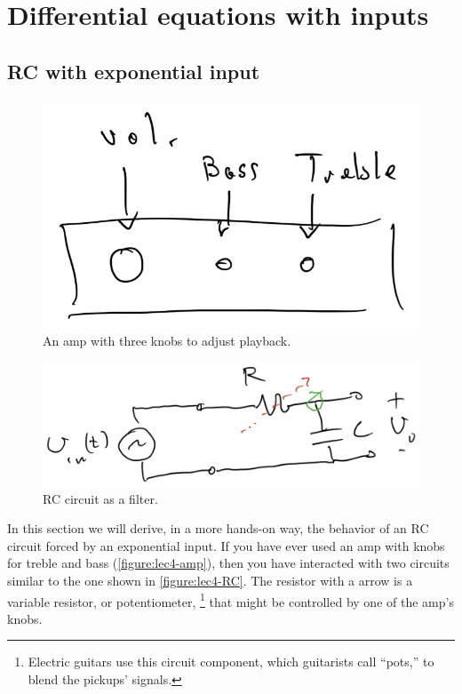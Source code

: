 \chapter{Differential equations with inputs}
\section{RC with exponential input}
\begin{figure}
  \centering
  \includegraphics[width=0.5\linewidth]{figures/4/amp}
  \caption{An amp with three knobs to adjust playback.}
  \label{figure:lec4-amp}
\end{figure}
\begin{figure}
  \centering
  \includegraphics[width=1\linewidth]{figures/4/RC}
  \caption{RC circuit as a filter.}
  \label{figure:lec4-RC}
\end{figure}

In this section we will derive, in a more hands-on way, the behavior of an RC circuit forced by an exponential input.
If you have ever used an amp%
with knobs for treble and bass (\autoref{figure:lec4-amp}), then you have interacted with two circuits
similar to the one shown in \autoref{figure:lec4-RC}.
The resistor with a arrow is a variable resistor, or potentiometer,%
\footnote{Electric guitars use this circuit component, which guitarists call ``pots,'' to blend the pickups' signals.}
that might be controlled by one of the amp's knobs.

